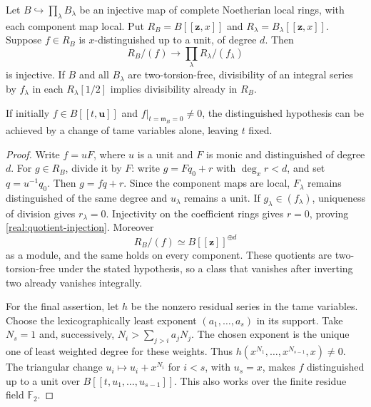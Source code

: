 \begin{lemma}\label{real:order-descent}
Let \(B\hookrightarrow\prod_\lambda B_\lambda\) be an injective map
of complete Noetherian local rings, with each component map local.
Put \(R_B=B[[\mathbf z,x]]\) and
\(R_\lambda=B_\lambda[[\mathbf z,x]]\). Suppose \(f\in R_B\) is
\(x\)-distinguished up to a unit, of degree \(d\). Then
\begin{equation}\label{real:quotient-injection}
 R_B/(f)\longrightarrow\prod_\lambda R_\lambda/(f_\lambda)
\end{equation}
is injective. If \(B\) and all \(B_\lambda\) are two-torsion-free,
divisibility of an integral series by \(f_\lambda\) in each
\(R_\lambda[1/2]\) implies divisibility already in \(R_B\).

If initially \(f\in B[[t,\mathbf u]]\) and
\(f|_{t=\mathfrak m_B=0}\ne0\), the distinguished hypothesis can be
achieved by a change of tame variables alone, leaving \(t\) fixed.
\end{lemma}

\begin{proof}
Write \(f=uF\), where \(u\) is a unit and \(F\) is monic and
distinguished of degree \(d\). For \(g\in R_B\), divide it by \(F\): write
\(g=Fq_0+r\) with \(\deg_xr<d\), and set \(q=u^{-1}q_0\).
Then \(g=fq+r\). Since the component maps are local,
\(F_\lambda\) remains distinguished of the same degree and
\(u_\lambda\) remains a unit. If \(g_\lambda\in(f_\lambda)\),
uniqueness of division gives \(r_\lambda=0\). Injectivity on the
coefficient rings gives \(r=0\), proving
\eqref{real:quotient-injection}. Moreover
\[
 R_B/(f)\simeq B[[\mathbf z]]^{\oplus d}
\]
as a module, and the same holds on every component. These quotients
are two-torsion-free under the stated hypothesis, so a class that
vanishes after inverting two already vanishes integrally.

For the final assertion, let \(h\) be the nonzero residual series in
the tame variables. Choose the lexicographically least exponent
\((a_1,\ldots,a_s)\) in its support. Take \(N_s=1\) and, successively,
\(N_i>\sum_{j>i}a_jN_j\). The chosen exponent is the unique one of
least weighted degree for these weights. Thus
\(h(x^{N_1},\ldots,x^{N_{s-1}},x)\ne0\). The triangular change
\(u_i\mapsto u_i+x^{N_i}\) for \(i<s\), with \(u_s=x\), makes
\(f\) distinguished up to a unit over
\(B[[t,u_1,\ldots,u_{s-1}]]\). This also works over the finite
residue field \(\mathbb F_2\).
\end{proof}

